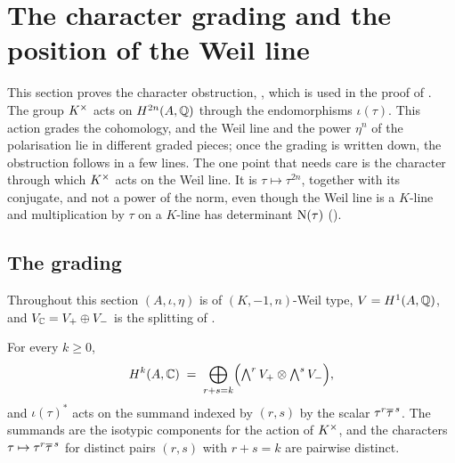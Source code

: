 \section{The character grading and the position of the Weil line}
\label{sec:characters}

This section proves the character obstruction, , which
is used in the proof of . The group $K^{\times}$
acts on $H^{2n}(A,\mathbb{Q})$ through the endomorphisms $\iota(\tau)$. This action
grades the cohomology, and the Weil line and the power $\eta^{n}$ of the
polarisation lie in different graded pieces; once the grading is written
down, the obstruction follows in a few lines. The one point that needs care
is the character through which $K^{\times}$ acts on the Weil line. It is
$\tau\mapsto\tau^{2n}$, together with its conjugate, and not a power of the
norm, even though the Weil line is a $K$-line and multiplication by $\tau$ on
a $K$-line has determinant $\mathrm{N}(\tau)$ ().

\subsection{The grading}

Throughout this section $(A,\iota,\eta)$ is of $(K,-1,n)$-Weil type,
$V=H^{1}(A,\mathbb{Q})$, and $V_{\mathbb{C}}=V_{+}\oplus V_{-}$ is the splitting of
.

\begin{proposition}\label{prop:grading}
For every $k\ge0$,
\begin{equation}\label{eq:grading}
  H^{k}(A,\mathbb{C})\;=\;\bigoplus_{r+s=k}
    \Bigl(\textstyle\bigwedge^{r}V_{+}\otimes\bigwedge^{s}V_{-}\Bigr),
\end{equation}
and $\iota(\tau)^{*}$ acts on the summand indexed by $(r,s)$ by the scalar
$\tau^{r}\overline{\tau}^{\,s}$. The summands are the isotypic components for the
action of $K^{\times}$, and the characters $\tau\mapsto\tau^{r}\overline{\tau}^{\,s}$ for
distinct pairs $(r,s)$ with $r+s=k$ are pairwise distinct.
\end{proposition}

